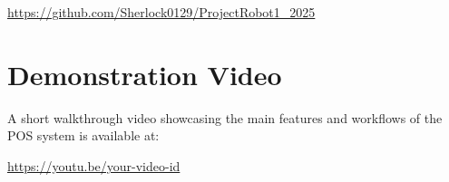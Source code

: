 \documentclass[a4paper,12pt]{article}
\begin{document}
\begin{center}
\url{https://github.com/Sherlock0129/ProjectRobot1_2025}
\end{center}

\section{Demonstration Video}
A short walkthrough video showcasing the main features and workflows of the POS system is available at:

\begin{center}
\href{https://youtu.be/your-video-id}{https://youtu.be/your-video-id}
\end{center}
\end{document}
